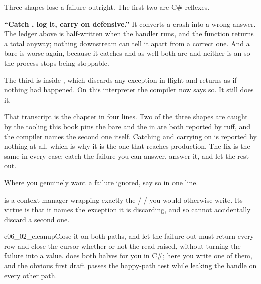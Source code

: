 \noindent
Three shapes lose a failure outright. The first two are C\# reflexes.


\begin{trapbox}
\textbf{\enquote{Catch , log it, carry on \dash{} defensive.}}
It converts a crash into a wrong answer. The ledger above is half-written
when the handler runs, and the function returns a total anyway; nothing
downstream can tell it apart from a correct one. And a bare 
is worse again, because it catches  and
 as well \dash{} both are  and neither
is an  \dash{} so the process stops being stoppable.
\end{trapbox}

\noindent
The third is  inside , which discards any
exception in flight and returns as if nothing had happened. On this
interpreter the compiler now says so. It still does it.


\noindent
That transcript is the chapter in four lines. Two of the three shapes are
caught by the tooling this book pins \dash{} the bare  and the
 in  are both reported by ruff, and the compiler
names the second one itself. Catching  and carrying on is
reported by nothing at all, which is why it is the one that reaches
production. The fix is the same in every case: catch the failure you can
answer, answer it, and let the rest out.


\noindent
Where you genuinely want a failure ignored, say so in one line.

\noindent
{} is a context manager wrapping exactly the
 /  /  you would otherwise write. Its
virtue is that it names the exception it is discarding, and so cannot
accidentally discard a second one.

\begin{exercise}{e06_02_cleanup}{Close it on both paths, and let the failure out}
 must return every row and close the cursor whether or not
the read raised, without turning the failure into a value.  does
both halves for you in C\#; here you write one of them, and the obvious
first draft passes the happy-path test while leaking the handle on every
other path.
\end{exercise}

